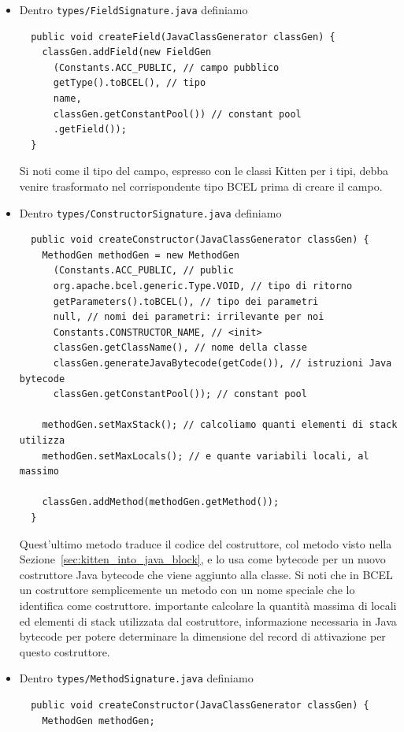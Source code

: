 \begin{itemize}
\item Dentro \texttt{types/FieldSignature.java} definiamo

{\small\begin{verbatim}
  public void createField(JavaClassGenerator classGen) {
    classGen.addField(new FieldGen
      (Constants.ACC_PUBLIC, // campo pubblico
      getType().toBCEL(), // tipo
      name,
      classGen.getConstantPool()) // constant pool
      .getField());
  }
\end{verbatim}}

\noindent
Si noti come il tipo del campo, espresso con le classi Kitten per i tipi,
debba venire trasformato nel corrispondente tipo BCEL prima di creare il campo.
\item Dentro \texttt{types/ConstructorSignature.java} definiamo
{\small\begin{verbatim}
  public void createConstructor(JavaClassGenerator classGen) {
    MethodGen methodGen = new MethodGen
      (Constants.ACC_PUBLIC, // public
      org.apache.bcel.generic.Type.VOID, // tipo di ritorno
      getParameters().toBCEL(), // tipo dei parametri
      null, // nomi dei parametri: irrilevante per noi
      Constants.CONSTRUCTOR_NAME, // <init>
      classGen.getClassName(), // nome della classe
      classGen.generateJavaBytecode(getCode()), // istruzioni Java bytecode
      classGen.getConstantPool()); // constant pool

    methodGen.setMaxStack(); // calcoliamo quanti elementi di stack utilizza
    methodGen.setMaxLocals(); // e quante variabili locali, al massimo

    classGen.addMethod(methodGen.getMethod());
  }
\end{verbatim}}

\noindent
Quest'ultimo metodo traduce il codice del costruttore, col metodo visto nella
Sezione~\ref{sec:kitten_into_java_block}, e lo usa come bytecode
per un nuovo costruttore Java bytecode che viene aggiunto alla classe.
Si noti che in BCEL un costruttore \e semplicemente un metodo con un nome speciale
che lo identifica come costruttore. \E importante calcolare la quantit\`a
massima di locali ed elementi di stack utilizzata dal costruttore, informazione
necessaria in Java bytecode per potere determinare la dimensione del record
di attivazione per questo costruttore.

\item Dentro \texttt{types/MethodSignature.java} definiamo
{\small\begin{verbatim}
  public void createConstructor(JavaClassGenerator classGen) {
    MethodGen methodGen;


\end{verbatim}}
\end{itemize}
